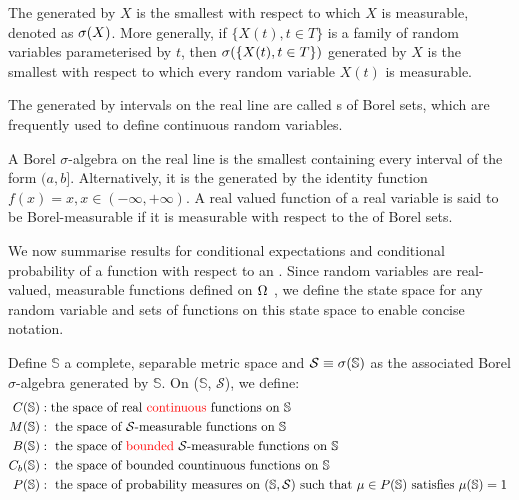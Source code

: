 \begin{defn}
	The \ofield{} generated by $X$ is the smallest  \ofield{} with respect to which $X$ is measurable, denoted as $\sigma(X)$. More generally, if $\{X(t), t \in T \}$ is a family of random variables parameterised by $t$, then $\sigma(\{X(t), t \in T \})$ generated by $X$ is the smallest \ofield{} with respect to which every random variable $X(t)$ is measurable. 
\end{defn}

The \ofield{} generated by intervals on the real line are called \ofield{}s of Borel sets, which are frequently used to define continuous random variables.
\begin{defn}
	A Borel $\sigma$-algebra on the real line  is the smallest \ofield{} containing every interval of the form $(a, b]$.  Alternatively, it is the \ofield{} generated by the identity function $f(x) =x, x \in  (-\infty, +\infty)$. A real valued function of a real variable is said to be Borel-measurable if it is measurable with respect to the \ofield{} of Borel sets. 
\end{defn}

We now summarise results for conditional expectations and conditional probability of a function with respect to an \ofield{}. Since random variables are real-valued, measurable functions defined on $\Omega_{{}}$ , we define the state space for any random variable and  sets of functions on this state space to enable concise notation. 

\begin{defn} Define $\mathbb{S}$ a {\color{red} complete, separable metric} space and $\mathcal{S} \equiv \sigma(\mathbb{S})$ as the associated Borel $\sigma$-algebra generated by $\mathbb{S}$. On ($\mathbb{S}$, $\mathcal{S}$), we define:
	\begin{align}
	C(\mathbb{S}) &: \text{the space of real {\color{red}  continuous} functions on $\mathbb{S}$} \\
	M(\mathbb{S}) &: \text{ the space of $\mathcal{S}$-measurable functions on } \mathbb{S} \\ %
	B(\mathbb{S}) &: \text{ the space of {\color{red} bounded} $\mathcal{S}$-measurable functions on } \mathbb{S} \\ %
	C_b(\mathbb{S}) &: \text{ the space of bounded countinuous functions on } \mathbb{S} \\ %
	P(\mathbb{S}) &: \text{ the space of probability measures  on } (\mathbb{S}, \mathcal{S}) \text{ such that $\mu \in P(\mathbb{S})$ satisfies $\mu(\mathbb{S})=1$ }
	\end{align}
\end{defn}


